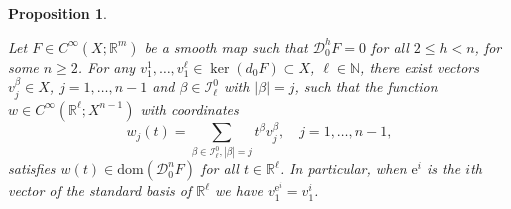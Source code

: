 \documentclass[12pt, reqno]{amsart}
\theoremstyle{plain}
\newtheorem {proposition} [theorem]{Proposition}
\theoremstyle{definition}
\theoremstyle{remark}
\numberwithin{equation}{section}
\newcommand{\R}{\mathbb{R}}
\newcommand{\N}{\mathbb{N}}
\newcommand{\I}{\mathcal{I}}
\newcommand{\oo}{\infty}
\newcommand{\0}{\theta}
\renewcommand{\b}{\beta}
\newcommand{\1}{{-1}}
\renewcommand{\l}{\ell}
\renewcommand{\=}{\coloneqq}
\renewcommand{\.}{\dots}
\newcommand{\mc}{\mathcal}
\newcommand{\dom}{\mathrm{dom}}
\begin{document}
\begin{proposition}\label{prop:corrrections}

Let
$F\in C^\infty(X;\R^m)$ be a smooth map such that   $ \mc D_0^h F = 0$ for all $ 2\le h<n$, for some $n\geq 2$.
For any $v_1^1, \ldots,   v_1^\l \in \ker(d_0F)\subset X$, $\l\in\N$, there exist vectors $v_j^\b\in X$,  $j=1,\.,n-1$ and $\b\in\I_\l^0$ with $|\b|=j$,
such that the function $w\in C^\oo(\R^\l;X^{n-1})$ with coordinates 
\begin{equation} \label{wallo1}
 w_j(t)=\sum_{\b\in \mathscr I_\l^0,|\b|=j}t^\b v_j^\b,\quad j=1,\ldots, n-1,
\end{equation}
satisfies $w(t)\in \dom(\mc D_0^n F)$ for all $t\in\R^\l$. In particular, when $\mathrm{e}^i$ is the $i$th vector of the standard basis of $\R^\l$
we have $v_1^{\mathrm{e} ^i}=v_1^i$.
\end{proposition}
\end{document}
